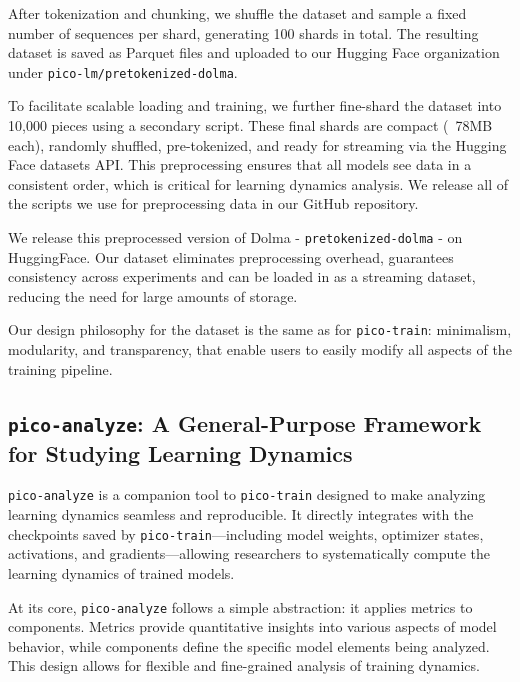 After tokenization and chunking, we shuffle the dataset and sample a fixed number of sequences per shard, generating 100 shards in total. The resulting dataset is saved as Parquet files and uploaded to our Hugging Face organization under \verb|pico-lm/pretokenized-dolma|.

To facilitate scalable loading and training, we further fine-shard the dataset into 10,000 pieces using a secondary script. These final shards are compact (~78MB each), randomly shuffled, pre-tokenized, and ready for streaming via the Hugging Face datasets API. This preprocessing ensures that all models see data in a consistent order, which is critical for learning dynamics analysis. We release all of the scripts we use for preprocessing data in our GitHub repository.

We release this preprocessed version of Dolma - \texttt{pretokenized-dolma} - on HuggingFace. Our dataset eliminates preprocessing overhead, guarantees consistency across experiments and can be loaded in as a streaming dataset, reducing the need for large amounts of storage.

Our design philosophy for the dataset is the same as for \texttt{pico-train}: minimalism, modularity, and transparency, that enable users to easily modify all aspects of the training pipeline. 

\subsection{\texttt{pico-analyze}: A General-Purpose Framework for Studying Learning Dynamics}

\texttt{pico-analyze} is a companion tool to \texttt{pico-train} designed to make analyzing learning dynamics seamless and reproducible. It directly integrates with the checkpoints saved by \texttt{pico-train}—including model weights, optimizer states, activations, and gradients—allowing researchers to systematically compute the learning dynamics of trained models.

At its core, \texttt{pico-analyze} follows a simple abstraction: it applies metrics to components. Metrics provide quantitative insights into various aspects of model behavior, while components define the specific model elements being analyzed. This design allows for flexible and fine-grained analysis of training dynamics.

